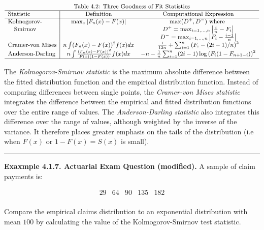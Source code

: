 \documentclass[]{book}
\theoremstyle{definition}
\theoremstyle{definition}
\theoremstyle{definition}
\theoremstyle{remark}
\begin{document}
\[
{\small
\begin{matrix}
\text{Table 4.2: Three Goodness of Fit Statistics} \\
\begin{array}{l|cc}
\hline
\text{Statistic} & \text{Definition} & \text{Computational Expression} \\
\hline
\text{Kolmogorov-} & \max_x |F_n(x) - F(x)| & \max(D^+, D^-) \text{ where } \\
~~~\text{Smirnov} && D^+ = \max_{i=1, \ldots, n} \left|\frac{i}{n} - F_i\right| \\
&& D^- = \max_{i=1, \ldots, n} \left| F_i - \frac{i-1}{n} \right| \\
\text{Cramer-von Mises} & n \int (F_n(x) - F(x))^2 f(x) dx & \frac{1}{12n} + \sum_{i=1}^n \left(F_i - (2i-1)/n\right)^2 \\
\text{Anderson-Darling} & n \int \frac{(F_n(x) - F(x))^2}{F(x)(1-F(x))} f(x) dx & -n-\frac{1}{n} \sum_{i=1}^n (2i-1) \log\left(F_i(1-F_{n+1-i})\right)^2 \\
\hline
\end{array} \\
\end{matrix}
}
\]

The \emph{Kolmogorov-Smirnov statistic} is the maximum absolute
difference between the fitted distribution function and the empirical
distribution function. Instead of comparing differences between single
points, the \emph{Cramer-von Mises statistic} integrates the difference
between the empirical and fitted distribution functions over the entire
range of values. The \emph{Anderson-Darling statistic} also integrates
this difference over the range of values, although weighted by the
inverse of the variance. It therefore places greater emphasis on the
tails of the distribution (i.e when \(F(x)\) or \(1-F(x)=S(x)\) is
small).

\begin{center}\rule{0.5\linewidth}{\linethickness}\end{center}

\textbf{Exaxmple 4.1.7. Actuarial Exam Question (modified).} A sample of
claim payments is:

\[\begin{array}{ccccc}
29 & 64 & 90 & 135 & 182  \\
\end{array}\]

Compare the empirical claims distribution to an exponential distribution
with mean \(100\) by calculating the value of the Kolmogorov-Smirnov
test statistic.
\end{document}
